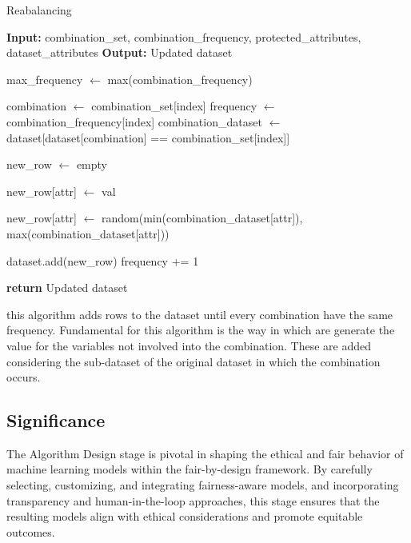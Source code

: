 \documentclass[12pt,a4paper,openright,twoside]{book}
\begin{document}
\begin{algorithm}[H]
    \caption{Reabalancing}
    \begin{algorithmic}[1]
        \State \textbf{Input:} combination\_set, combination\_frequency, protected\_attributes, dataset\_attributes
        \State \textbf{Output:} Updated dataset

        \State max\_frequency $\gets$ max(combination\_frequency)

            \State combination $\gets$ combination\_set[index]
            \State frequency $\gets$ combination\_frequency[index]
            \State combination\_dataset $\gets$ dataset[dataset[combination] == combination\_set[index]]

                \State new\_row $\gets$ empty

                    \State new\_row[attr] $\gets$ val
                \EndFor

                    \State new\_row[attr] $\gets$ random(min(combination\_dataset[attr]), max(combination\_dataset[attr]))
                \EndFor

                \State dataset.add(new\_row)
                \State frequency $+$= 1
            \EndWhile
        \EndFor

        \State \textbf{return} Updated dataset
    \end{algorithmic}
\end{algorithm}

this algorithm adds rows to the dataset until every combination have the same frequency. Fundamental for this algorithm is the way in which are generate the value for the variables not involved into the combination. These are added considering the sub-dataset of the original dataset in which the combination occurs. 


\subsection{Significance}

The Algorithm Design stage is pivotal in shaping the ethical and fair behavior of machine learning models within the fair-by-design framework. By carefully selecting, customizing, and integrating fairness-aware models, and incorporating transparency and human-in-the-loop approaches, this stage ensures that the resulting models align with ethical considerations and promote equitable outcomes.
\end{document}
